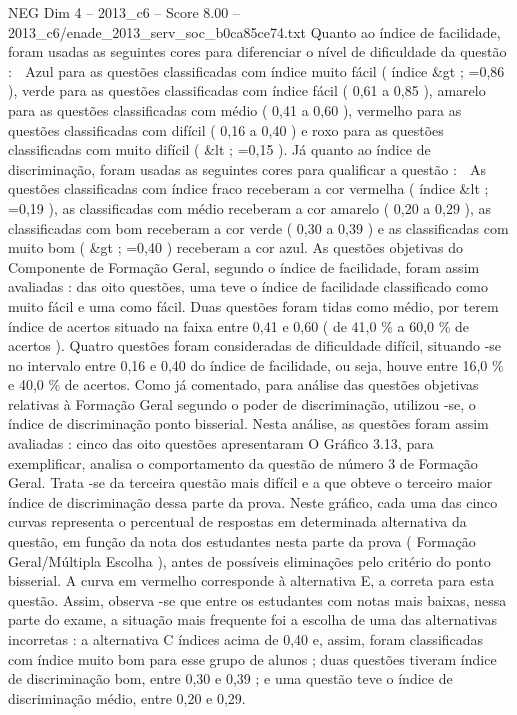 \begin{textsample}{NEG Dim 4 – 2013\_c6 – Score 8.00 – 2013\_c6/enade\_2013\_serv\_soc\_b0ca85ce74.txt}
Quanto ao índice de facilidade, foram usadas as seguintes cores para diferenciar o nível de dificuldade da questão :  Azul para as questões classificadas com índice muito fácil ( índice \&gt ; =0,86 ), verde para as questões classificadas com índice fácil ( 0,61 a 0,85 ), amarelo para as questões classificadas com médio ( 0,41 a 0,60 ), vermelho para as questões classificadas com difícil ( 0,16 a 0,40 ) e roxo para as questões classificadas com muito difícil ( \&lt ; =0,15 ).
Já quanto ao índice de discriminação, foram usadas as seguintes cores para qualificar a questão :  As questões classificadas com índice fraco receberam a cor vermelha ( índice \&lt ; =0,19 ), as classificadas com médio receberam a cor amarelo ( 0,20 a 0,29 ), as classificadas com bom receberam a cor verde ( 0,30 a 0,39 ) e as classificadas com muito bom ( \&gt ; =0,40 ) receberam a cor azul.
As questões objetivas do Componente de Formação Geral, segundo o índice de facilidade, foram assim avaliadas : das oito questões, uma teve o índice de facilidade classificado como muito fácil e uma como fácil.
Duas questões foram tidas como médio, por terem índice de acertos situado na faixa entre 0,41 e 0,60 ( de 41,0 \% a 60,0 \% de acertos ).
Quatro questões foram consideradas de dificuldade difícil, situando -se no intervalo entre 0,16 e 0,40 do índice de facilidade, ou seja, houve entre 16,0 \% e 40,0 \% de acertos.
Como já comentado, para análise das questões objetivas relativas à Formação Geral segundo o poder de discriminação, utilizou -se, o índice de discriminação ponto bisserial.
Nesta análise, as questões foram assim avaliadas : cinco das oito questões apresentaram O Gráfico 3.13, para exemplificar, analisa o comportamento da questão de número 3 de Formação Geral.
Trata -se da terceira questão mais difícil e a que obteve o terceiro maior índice de discriminação dessa parte da prova.
Neste gráfico, cada uma das cinco curvas representa o percentual de respostas em determinada alternativa da questão, em função da nota dos estudantes nesta parte da prova ( Formação Geral/Múltipla Escolha ), antes de possíveis eliminações pelo critério do ponto bisserial.
A curva em vermelho corresponde à alternativa E, a correta para esta questão.
Assim, observa -se que entre os estudantes com notas mais baixas, nessa parte do exame, a situação mais frequente foi a escolha de uma das alternativas incorretas : a alternativa C índices acima de 0,40 e, assim, foram classificadas com índice muito bom para esse grupo de alunos ; duas questões tiveram índice de discriminação bom, entre 0,30 e 0,39 ; e uma questão teve o índice de discriminação médio, entre 0,20 e 0,29.

\end{textsample}
